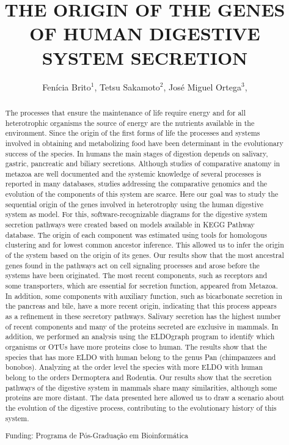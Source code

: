 \documentclass[twoside]{article}
\title{\vspace{-15mm}\fontsize{24pt}{10pt}\selectfont\textbf{ THE ORIGIN OF THE GENES OF HUMAN DIGESTIVE SYSTEM SECRETION }} %
\author{ Fenícia Brito$^{1}$, Tetsu Sakamoto$^{2}$, José Miguel Ortega$^{3}$, }
\affil{ 1 UFMG

2 Universidade Federal de Minas Gerais. Laboratório de Biodados.

3 Universidade Federal de Minas Gerais, Laboratório de Biodados.

 }
\date{}
\begin{document}
  
  
  \maketitle %
  
  
  \thispagestyle{fancy} %
  
  
  \begin{abstract}
  The processes that ensure the maintenance of life require energy and for all heterotrophic organisms the source of energy are the nutrients available in the environment. Since the origin of the first forms of life the processes and systems involved in obtaining and metabolizing food have been determinant in the evolutionary success of the species. In humans the main stages of digestion depends on salivary, gastric, pancreatic and biliary secretions. Although studies of comparative anatomy in metazoa are well documented and the systemic knowledge of several processes is reported in many databases, studies addressing the comparative genomics and the evolution of the components of this system are scarce. Here our goal was to study the sequential origin of the genes involved in heterotrophy using the human digestive system as model. For this, software-recognizable diagrams for the digestive system secretion pathways were created based on models available in KEGG Pathway database. The origin of each component was estimated using tools for homologous clustering and for lowest common ancestor inference. This allowed us to infer the origin of the system based on the origin of its genes. Our results show that the most ancestral genes found in the pathways act on cell signaling processes and arose before the systems have been originated. The most recent components, such as receptors and some transporters, which are essential for secretion function, appeared from Metazoa. In addition, some components with auxiliary function, such as bicarbonate secretion in the pancreas and bile, have a more recent origin, indicating that this process appears as a refinement in these secretory pathways. Salivary secretion has the highest number of recent components and many of the proteins secreted are exclusive in mammals. In addition, we performed an analysis using the ELDOgraph program to identify which organisms or OTUs have more proteins close to human. The results show that the species that has more ELDO with human belong to the genus Pan (chimpanzees and bonobos). Analyzing at the order level the species with more ELDO with human belong to the orders Dermoptera and Rodentia. Our results show that the secretion pathways of the digestive system in mammals share many similarities, although some proteins are more distant. The data presented here allowed us to draw a scenario about the evolution of the digestive process, contributing to the evolutionary history of this system.
  
  Funding: Programa de P\'os-Gradua\c{c}\~ao em Bioinform\'atica \\ 
  \end{abstract}
  
\end{document}
